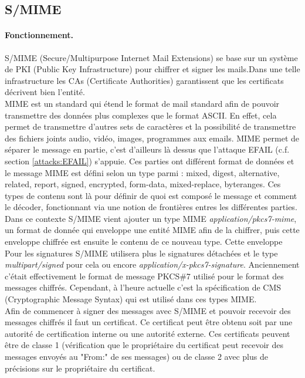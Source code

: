 \subsection{S/MIME}
\label{protocols:SMIME}
\paragraph*{Fonctionnement.}
S/MIME (Secure/Multipurpose Internet Mail Extensions) se base sur un système de PKI (Public Key Infrastructure) pour chiffrer et signer les mails.Dans une telle infrastructure les CAs (Certificate Authorities) garantissent que les certificats décrivent bien l'entité.\\
MIME est un standard qui étend le format de mail standard afin de pouvoir transmettre des données plus complexes que le format ASCII. En effet, cela permet de transmettre d'autres sets de caractères et la possibilité de transmettre des fichiers joints audio, vidéo, images, programmes aux emails. MIME permet de séparer le message en partie, c'est d'ailleurs là dessus que l'attaque EFAIL (c.f. section \ref{attacks:EFAIL}) s'appuie. Ces parties ont différent format de données et le message MIME est défini selon un type parmi : mixed, digest, alternative, related, report, signed, encrypted, form-data, mixed-replace, byteranges. Ces types de contenu sont là pour définir de quoi est composé le message et comment le décoder, fonctionnant via une notion de frontières entres les différentes parties.\\
Dans ce contexte S/MIME vient ajouter un type MIME \textit{application/pkcs7-mime}, un format de donnée qui enveloppe une entité MIME afin de la chiffrer, puis cette enveloppe chiffrée est ensuite le contenu de ce nouveau type. Cette enveloppe  Pour les signatures S/MIME utilisera plus le signatures détachées et le type \textit{multipart/signed} pour cela ou encore \textit{application/x-pkcs7-signature}. Anciennement c'était effectivement le format de message PKCS\#7 utilisé pour le format des messages chiffrés. Cependant, à l'heure actuelle c'est la spécification de CMS (Cryptographic Message Syntax) qui est utilisé dans ces types MIME.\\
Afin de commencer à signer des messages avec S/MIME et pouvoir recevoir des messages chiffrés il faut un certificat. Ce certificat peut être obtenu soit par une autorité de certification interne ou une autorité externe. Ces certificats peuvent être de classe 1 (vérification que le propriétaire du certificat peut recevoir des messages envoyés au "From:" de ses messages) ou de classe 2 avec plus de précisions sur le propriétaire du certificat.\\
